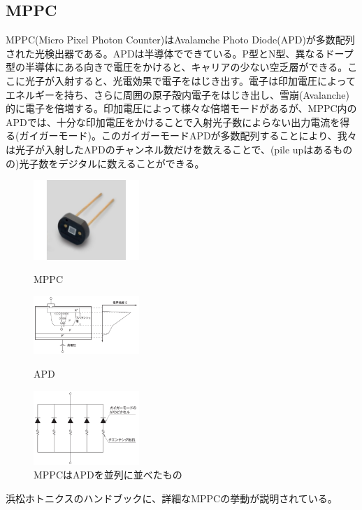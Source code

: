 \documentclass[10pt]{ujarticle}
\begin{document}
\subsection{MPPC}
MPPC(Micro Pixel Photon Counter)はAvalamche Photo Diode(APD)が多数配列された光検出器である。APDは半導体でできている。P型とN型、異なるドープ型の半導体にある向きで電圧をかけると、キャリアの少ない空乏層ができる。ここに光子が入射すると、光電効果で電子をはじき出す。電子は印加電圧によってエネルギーを持ち、さらに周囲の原子殻内電子をはじき出し、雪崩(Avalanche)的に電子を倍増する。印加電圧によって様々な倍増モードがあるが、MPPC内のAPDでは、十分な印加電圧をかけることで入射光子数によらない出力電流を得る(ガイガーモード)。このガイガーモードAPDが多数配列することにより、我々は光子が入射したAPDのチャンネル数だけを数えることで、(pile upはあるものの)光子数をデジタルに数えることができる。
\begin{figure}[h]
\begin{minipage}[t]{0.33\hsize}
\begin{center}
\includegraphics[width=4cm]{mppc.jpg}
\end{center}
\caption{MPPC}
\end{minipage}
\begin{minipage}[t]{0.33\hsize}
\begin{center}
\includegraphics[width=4cm]{APDstructure.PNG}
\end{center}
\caption{APD}
\end{minipage}
\begin{minipage}[t]{0.33\hsize}
\begin{center}
\includegraphics[width=4cm]{QuenchingArray.PNG}
\end{center}
\caption{MPPCはAPDを並列に並べたもの}
\end{minipage}
\end{figure}
浜松ホトニクスのハンドブックに、詳細なMPPCの挙動が説明されている。\cite{hamamatsu}
\end{document}
